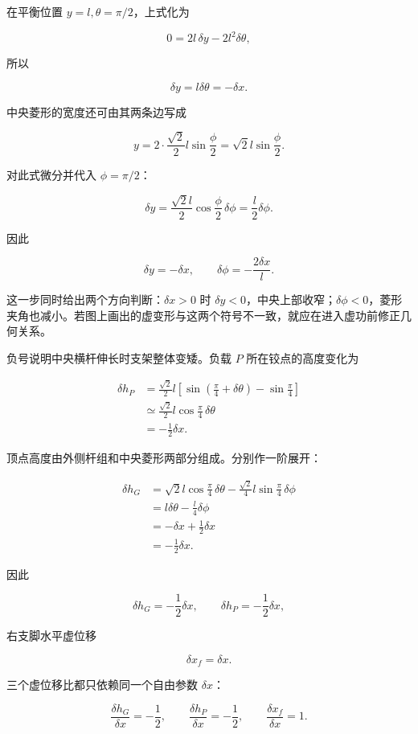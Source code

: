 \documentclass[12pt,a4paper,UTF8]{ctexart}
\begin{document}
在平衡位置 \(y=l,\theta=\pi/2\)，上式化为

\[
0=2l\,\delta y-2l^2\delta\theta,
\]

所以

\[
\delta y=l\delta\theta=-\delta x.
\]

中央菱形的宽度还可由其两条边写成

\[
y=2\cdot\frac{\sqrt2}{2}l\sin\frac\phi2
=\sqrt2l\sin\frac\phi2.
\]

对此式微分并代入 \(\phi=\pi/2\)：

\[
\delta y
=\frac{\sqrt2l}{2}\cos\frac\phi2\,\delta\phi
=\frac l2\delta\phi.
\]

因此

\[
\delta y=-\delta x,
\qquad
\delta\phi=-\frac{2\delta x}{l}.
\tag{5}
\]

这一步同时给出两个方向判断：\(\delta x>0\) 时
\(\delta y<0\)，中央上部收窄；\(\delta\phi<0\)，菱形夹角也减小。若图上画出的虚变形与这两个符号不一致，就应在进入虚功前修正几何关系。

负号说明中央横杆伸长时支架整体变矮。负载 \(P\) 所在铰点的高度变化为

\[
\begin{aligned}
\delta h_P
&=\frac{\sqrt2}{2}l
\left[
\sin\left(\frac\pi4+\delta\theta\right)
-\sin\frac\pi4
\right]\\
&\simeq\frac{\sqrt2}{2}l
\cos\frac\pi4\,\delta\theta\\
&=-\frac12\delta x.
\end{aligned}
\tag{6}
\]

顶点高度由外侧杆组和中央菱形两部分组成。分别作一阶展开：

\[
\begin{aligned}
\delta h_G
&=\sqrt2l\cos\frac\pi4\,\delta\theta
-\frac{\sqrt2}{4}l\sin\frac\pi4\,\delta\phi\\
&=l\delta\theta-\frac l4\delta\phi\\
&=-\delta x+\frac12\delta x\\
&=-\frac12\delta x.
\end{aligned}
\tag{7}
\]

因此

\[
\delta h_G=-\frac12\delta x,
\qquad
\delta h_P=-\frac12\delta x,
\tag{8}
\]

右支脚水平虚位移

\[
\delta x_f=\delta x.
\tag{9}
\]

三个虚位移比都只依赖同一个自由参数 \(\delta x\)：

\[
\frac{\delta h_G}{\delta x}=-\frac12,
\qquad
\frac{\delta h_P}{\delta x}=-\frac12,
\qquad
\frac{\delta x_f}{\delta x}=1.
\]
\end{document}

